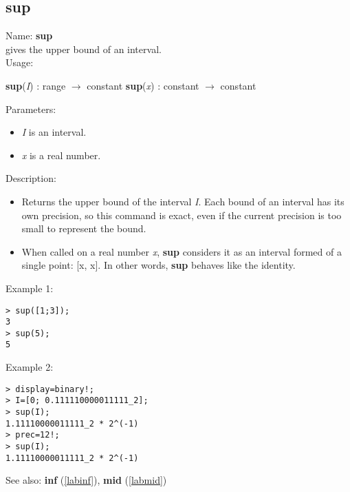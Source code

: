 \subsection{sup}
\label{labsup}
\noindent Name: \textbf{sup}\\
gives the upper bound of an interval.\\
\noindent Usage: 
\begin{center}
\textbf{sup}(\emph{I}) : \textsf{range} $\rightarrow$ \textsf{constant}
\textbf{sup}(\emph{x}) : \textsf{constant} $\rightarrow$ \textsf{constant}
\end{center}
Parameters: 
\begin{itemize}
\item \emph{I} is an interval.
\item \emph{x} is a real number.
\end{itemize}
\noindent Description: \begin{itemize}

\item Returns the upper bound of the interval \emph{I}. Each bound of an interval has its 
   own precision, so this command is exact, even if the current precision is too 
   small to represent the bound.

\item When called on a real number \emph{x}, \textbf{sup} considers it as an interval formed
   of a single point: [x, x]. In other words, \textbf{sup} behaves like the identity.
\end{itemize}
\noindent Example 1: 
\begin{center}\begin{minipage}{15cm}\begin{Verbatim}[frame=single]
> sup([1;3]);
3
> sup(5);
5
\end{Verbatim}
\end{minipage}\end{center}
\noindent Example 2: 
\begin{center}\begin{minipage}{15cm}\begin{Verbatim}[frame=single]
> display=binary!;
> I=[0; 0.111110000011111_2];
> sup(I);
1.11110000011111_2 * 2^(-1)
> prec=12!;
> sup(I);
1.11110000011111_2 * 2^(-1)
\end{Verbatim}
\end{minipage}\end{center}
See also: \textbf{inf} (\ref{labinf}), \textbf{mid} (\ref{labmid})
